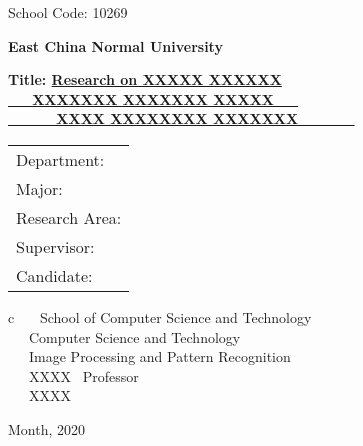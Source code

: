 \newpage

\pagestyle{empty}

\hskip 1.4cm {\large School Code: 10269}\\
\hspace*{\fill}{\large Student Number: 51170000000}

\vskip 2cm

\begin{center}
	\fontsize{42pt}{1.1cm}\selectfont \textbf{East China Normal University}
\end{center}

\vskip 3cm

\begin{center}
{\erhao\bf  Title: \underline{Research on XXXXX XXXXXX }}\\
{\erhao\bf  \underline{~~~XXXXXXX XXXXXXX XXXXX~~~}}\\
{\erhao\bf  \underline{~~~~~~XXXX XXXXXXXX XXXXXXX~~~~~~~}}
\end{center}

\vskip 2cm {\large
\begin{center}
\begin{tabular}{l}
Department:\\
Major:\\
Research Area:\\
Supervisor:\\
Candidate:
\end{tabular}
\begin{tabular}c
~~~School of Computer Science and Technology \\
\hline ~~~Computer Science and Technology  \\
\hline ~~~Image Processing and Pattern Recognition\\
\hline ~~~XXXX~ Professor  \\
\hline ~~~XXXX  \\
\hline
\end{tabular}
\end{center}}

\vskip 30mm

\begin{center}
{\Large Month, 2020}
\end{center}
